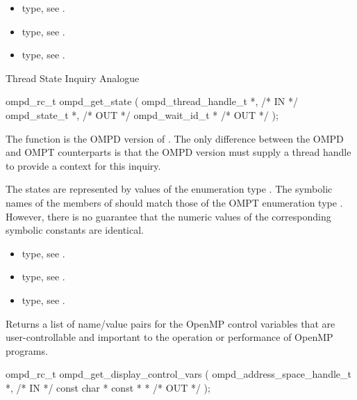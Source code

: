 \crossreferences
\begin{itemize}
	\item {} type, see .
	\item {} type, see .
	\item {} type, see .
\end{itemize}


\summary
Thread State Inquiry Analogue
\format
\cspecificstart
\begin{boxedcode}
ompd\_rc\_t ompd\_get\_state (
  ompd\_thread\_handle\_t *,                             /* IN */
  ompd\_state\_t *,                                    /* OUT */
  ompd\_wait\_id\_t    *                                   /* OUT */
);
\end{boxedcode}
\cspecificend

\descr
The function  is the  OMPD version of
. 
The only difference between the OMPD and OMPT counterparts
is that the OMPD version must supply a thread handle to provide
a context for this inquiry.

\argdesc
The states are represented by values of the enumeration type
.
The symbolic names of the members of  should
match those of the OMPT enumeration type .
However, there is no guarantee that the numeric values of the corresponding
symbolic constants are identical.

\crossreferences
\begin{itemize}
	\item {} type, see .
	\item {} type, see .
	\item {} type, see .
\end{itemize}




\label{sec:ompd_get_display_control_vars}
\summary
Returns a list of name/value pairs for the OpenMP control variables
that are user-controllable and important to the operation or
performance of OpenMP programs.
\format
\cspecificstart
\begin{boxedcode}
ompd\_rc\_t ompd\_get\_display\_control\_vars (
  ompd\_address\_space\_handle\_t *,  /* IN */
  const char * const *        *         /* OUT */
);
\end{boxedcode}
\cspecificend

